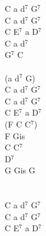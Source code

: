 \documentclass[a5paper, 10pt]{book}
\begin{document}
\begin{minipage}[t]{0.3\textwidth}
  C a d$^7$ G$^7$\\
  C a d$^7$ G$^7$\\
  C E$^7$ a D$^7$\\

  C a d$^7$\\
  G$^7$ C\\
  \\
  (a d$^7$ G)\\
  C a d$^7$ G$^7$\\
  C a d$^7$ G$^7$\\
  C E$^7$ a D$^7$\\

  (F C C$^7$)\\
  F Gis\\
  C C$^7$\\
  D$^7$\\
  G Gis G\\
  \\
  \\
  C a d$^7$ G$^7$\\
  C a d$^7$ G$^7$\\
  C E$^7$ a D$^7$\\

\end{minipage}

\newpage
\end{document}
